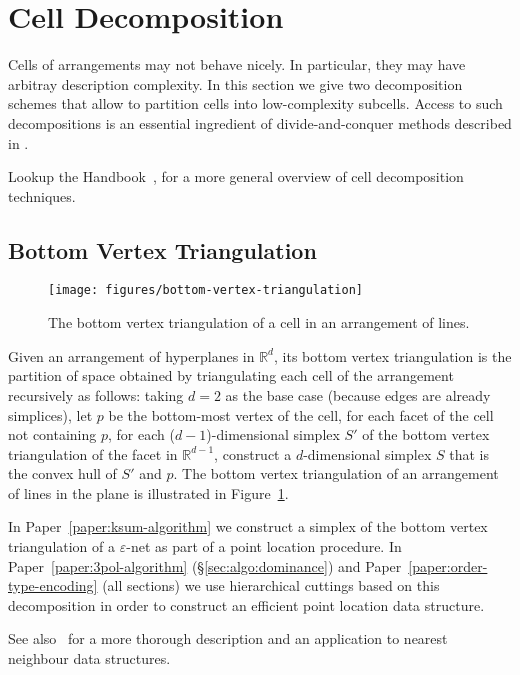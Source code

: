 \section{\done Cell Decomposition}

Cells of arrangements may not behave nicely. In particular, they may have
arbitray description complexity.
%
In this section we give two decomposition schemes that allow to partition cells
into low-complexity subcells.
%
Access to such decompositions is an essential ingredient of divide-and-conquer
methods described in .

Lookup the Handbook~\cite[\S{}24.3.2]{Hal04},
for a more general overview of cell decomposition techniques.

\subsection{Bottom Vertex Triangulation}%
\label{sec:arrangements:triangulation}

\begin{figure}
  \centering{}
  \texttt{[image: figures/bottom-vertex-triangulation]}
  \caption{%
    The bottom vertex triangulation of a cell in an arrangement of lines.%
  }%
  \label{fig:bvt}
\end{figure}

Given an arrangement of hyperplanes in \(\mathbb{R}^d\), its bottom vertex
triangulation is the partition of space obtained by triangulating each cell of
the arrangement recursively as follows: taking \(d=2\) as the base case
(because edges are already simplices),
let \(p\) be the bottom-most vertex of the cell,
for each facet of the cell not containing \(p\),
for each (\(d-1\))-dimensional simplex \(S'\) of the bottom vertex triangulation
of the facet in \(\mathbb{R}^{d-1}\),
construct a \(d\)-dimensional simplex \(S\) that is the convex hull of
\(S'\) and \(p\).
%
The
bottom vertex triangulation of an arrangement of lines in the plane is illustrated
in Figure~\ref{fig:bvt}.

In Paper~\ref{paper:ksum-algorithm} we construct a simplex of the bottom vertex
triangulation of a \(\varepsilon\)-net as part of a point location procedure.
%
In Paper~\ref{paper:3pol-algorithm} (\S\ref{sec:algo:dominance})
and Paper~\ref{paper:order-type-encoding} (all sections)
we use hierarchical cuttings based on this decomposition in order to construct
an efficient point location data structure.

See also~\cite{Cla88} for a more thorough description and an application to
nearest neighbour data structures.

